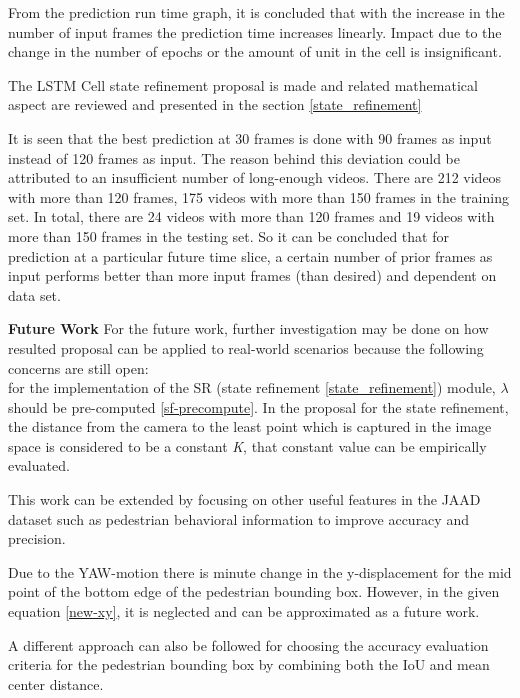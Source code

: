 From the prediction run time graph, it is concluded that with the increase in the number of input frames the prediction time increases linearly. Impact due to the change in the number of epochs or the amount of unit in the cell is insignificant.

The LSTM Cell state refinement proposal is made and related mathematical aspect are reviewed and presented in the section \ref{state_refinement}


It is seen that the best prediction at 30 frames is done with 90 frames as input instead of 120 frames as input. The reason behind this deviation could be attributed to an insufficient number of long-enough videos. There are 212 videos with more than 120 frames, 175 videos with more than 150 frames in the training set. In total, there are 24 videos with more than 120 frames and 19 videos with more than 150 frames in the testing set. So it can be concluded that for prediction at a particular future time slice, a certain number of prior frames as input performs better than more input frames (than desired) and dependent on data set.

\newpara

\textbf{Future Work}
For the future work, further investigation may be done on how resulted proposal can be applied to real-world scenarios because the following concerns are still open: \\
for the implementation of the SR (state refinement \ref{state_refinement}) module, $\lambda$ should be pre-computed \ref{sf-precompute}. In the proposal for the state refinement, the distance from the camera to the least point which is captured in the image space is considered to be a constant \textit{K}, that constant value can be empirically evaluated.

This work can be extended by focusing on other useful features in the JAAD dataset such as pedestrian behavioral information to improve accuracy and precision.

Due to the YAW-motion there is minute change in the y-displacement for the mid point of the bottom edge of the pedestrian bounding box. However, in the given equation \ref{new-xy}, it is neglected and can be approximated as a future work.

A different approach can also be followed for choosing the accuracy evaluation criteria for the pedestrian bounding box by combining both the IoU and mean center distance.
